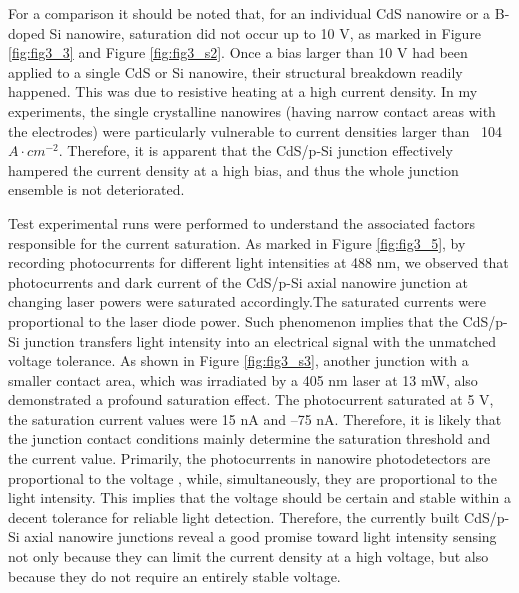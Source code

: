 For a comparison it should be noted that, for an individual  CdS nanowire or a B-doped Si nanowire, saturation did not occur up to 10 V, as marked in Figure \ref{fig:fig3_3} and Figure \ref{fig:fig3_s2}. Once a bias larger than 10 V had been applied to a single CdS or Si nanowire, their structural breakdown readily happened. This was due to resistive heating at a high current density. \cite{Wu2004} In my experiments, the single crystalline nanowires (having narrow contact areas with the electrodes) were particularly vulnerable to current densities larger than ~104 $A\cdot cm^{-2}$. Therefore, it is apparent that the CdS/p-Si junction effectively hampered the current density at a high bias, and thus the whole junction ensemble is not deteriorated. 


Test experimental runs were performed to understand the associated factors responsible for the current saturation. As marked in Figure \ref{fig:fig3_5}, by recording  photocurrents for different light intensities at 488 nm, we observed that photocurrents and dark current of the CdS/p-Si axial nanowire junction at changing laser powers were saturated accordingly.The saturated currents were proportional to the laser diode power. Such phenomenon implies that the CdS/p-Si junction transfers light intensity into an electrical signal with the unmatched voltage tolerance. As shown in Figure \ref{fig:fig3_s3}, another junction with a smaller contact area, which was irradiated by a 405 nm laser at 13 mW, also demonstrated a profound saturation effect. The photocurrent saturated at 5 V, the saturation current values were 15 nA and –75 nA. Therefore, it is likely that the junction contact conditions mainly determine the saturation threshold and the current value. Primarily, the photocurrents in nanowire photodetectors are proportional to the voltage \cite{577926470}, while, simultaneously, they are proportional to the light intensity. This implies that the voltage should be certain and stable within a decent tolerance for reliable light detection. Therefore, the currently built CdS/p-Si axial nanowire junctions reveal a good promise toward light intensity sensing not only because they can limit the current density at a high voltage, but also because they do not require an entirely stable voltage. 

